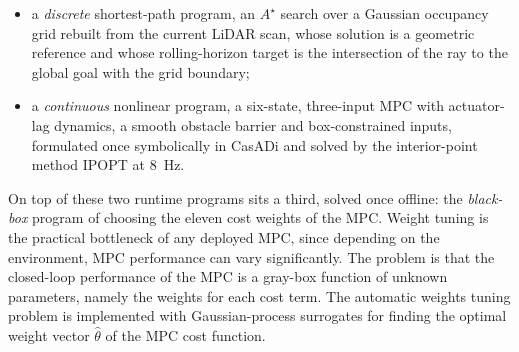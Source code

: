 \documentclass[11pt,a4paper]{article}
\newcommand{\astar}{$A^\star$}
\begin{document}
\begin{itemize}
  \item a \emph{discrete} shortest-path program, an \astar{} search over a Gaussian occupancy grid rebuilt
        from the current LiDAR scan, whose solution is a geometric reference and whose rolling-horizon target
        is the intersection of the ray to the global goal with the grid boundary;
  \item a \emph{continuous} nonlinear program, a six-state, three-input MPC with actuator-lag dynamics, a
        smooth obstacle barrier and box-constrained inputs, formulated once symbolically in CasADi
        \cite{andersson2019casadi} and solved by the interior-point method IPOPT
        \cite{wachter2006ipopt} at $8$~Hz.
\end{itemize}

On top of these two runtime programs sits a third, solved once offline: the \emph{black-box} program of
choosing the eleven cost weights of the MPC. Weight tuning is the practical bottleneck of any deployed MPC, since depending on the environment, MPC performance can vary significantly. The problem is that the closed-loop performance of the MPC is a gray-box function of unknown parameters, namely the weights for each cost term. The automatic weights tuning problem is
implemented with Gaussian-process surrogates \cite{rasmussen2006gp,shahriari2016bo} for finding the optimal weight vector $\hat\theta$ of the MPC cost function. 
\end{document}
